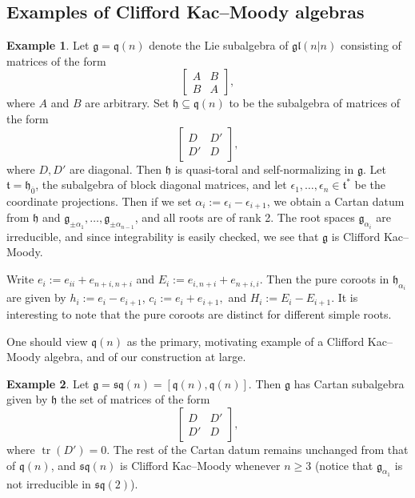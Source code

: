 \documentclass[12pt, a4paper, reqno]{amsart}
\def\q{\mathfrak{q}}
\def\g{\mathfrak{g}}
\def\h{\mathfrak{h}}
\def\l{\mathfrak{l}}
\def\s{\mathfrak{s}}
\def\ol{\overline}
\theoremstyle{definition}
\theoremstyle{definition}
\theoremstyle{definition}
\newtheorem{example}{Example}}
\numberwithin{theorem}{section}
\numberwithin{lemma}{section}
\numberwithin{remark}{section}
\numberwithin{definition}{section}
\numberwithin{corollary}{section}
\numberwithin{proposition}{section}
\numberwithin{example}{section}
\begin{document}
	\subsection{Examples of Clifford Kac--Moody algebras}
	\begin{example}
		Let $\g=\q(n)$ denote the Lie subalgebra of $\g\l(n|n)$ consisting of matrices of the form
		\[
		\begin{bmatrix}
			A & B\\ B &A
		\end{bmatrix},
		\]
		where $A$ and $B$ are arbitrary.  Set $\h\subseteq\q(n)$ to be the subalgebra of matrices of the form
		\[
		\begin{bmatrix} D & D'\\ D' & D\end{bmatrix},
		\]
		where $D,D'$ are diagonal.  Then $\h$ is quasi-toral and self-normalizing in $\g$.  Let $\mathfrak{t}=\h_{\ol{0}}$, the subalgebra of block diagonal matrices, and let $\epsilon_1,\dots,\epsilon_n\in\mathfrak{t}^*$ be the coordinate projections.  Then if we set $\alpha_i:=\epsilon_i-\epsilon_{i+1}$, we obtain a Cartan datum from $\h$ and $\g_{\pm\alpha_1},\dots,\g_{\pm\alpha_{n-1}}$, and all roots are of rank 2.  The root spaces $\g_{\alpha_i}$ are irreducible, and since integrability is easily checked, we see that $\g$ is Clifford Kac--Moody.  
		
		Write $e_i:=e_{ii}+e_{n+i,n+i}$ and $E_{i}:=e_{i,n+i}+e_{n+i,i}$.  Then the pure coroots in $\h_{\alpha_i}$ are given by $h_i:=e_i-e_{i+1}$, $c_i:=e_i+e_{i+1},$ and $H_i:=E_{i}-E_{i+1}$.  It is interesting to note that the pure coroots are distinct for different simple roots.
		
		One should view $\q(n)$ as the primary, motivating example of a Clifford Kac--Moody algebra, and of our construction at large.  
		
	\end{example}
	
	\begin{example}\label{example_sqn}
		Let $\g=\s\q(n)=[\q(n),\q(n)]$.  Then $\g$ has Cartan subalgebra given by $\h$ the set of matrices of the form
		\[
		\begin{bmatrix}
			D & D'\\ D' & D
		\end{bmatrix},
		\] 
		where $\operatorname{tr}(D')=0$.  The rest of the Cartan datum remains unchanged from that of $\q(n)$, and $\s\q(n)$ is Clifford Kac--Moody whenever $n\geq 3$ (notice that $\g_{\alpha_1}$ is not irreducible in $\s\q(2)$).  
	\end{example}
	
\end{document}
